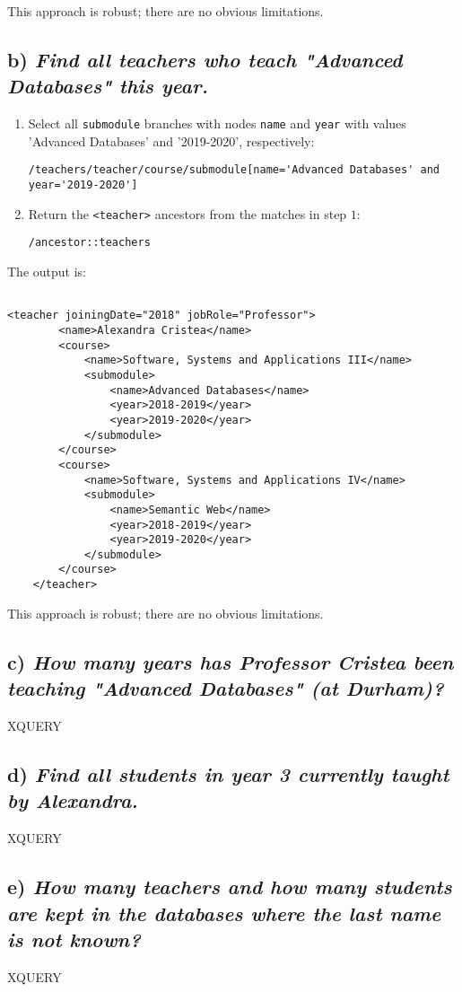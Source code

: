 \documentclass[11pt]{article} %
\begin{document}
This approach is robust; there are no obvious limitations.

\subsection*{b) \textit{Find all teachers who teach "Advanced Databases" this year.}}

\begin{enumerate}

	\item{Select all \verb|submodule| branches with nodes \verb|name| and \verb|year| with values 'Advanced Databases' and '2019-2020', respectively:} 

\begin{center}

	\verb|/teachers/teacher/course/submodule[name='Advanced Databases' and year='2019-2020']|

\end{center}

	\item{Return the \verb|<teacher>| ancestors from the matches in step $1$:}

\begin{center}

	\verb|/ancestor::teachers|

\end{center}

\end{enumerate}

The output is:

\begin{verbatim}

<teacher joiningDate="2018" jobRole="Professor">
        <name>Alexandra Cristea</name>
        <course>
            <name>Software, Systems and Applications III</name>
            <submodule>
                <name>Advanced Databases</name>
                <year>2018-2019</year>
                <year>2019-2020</year>
            </submodule>
        </course>
        <course>
            <name>Software, Systems and Applications IV</name>
            <submodule>
                <name>Semantic Web</name>
                <year>2018-2019</year>
                <year>2019-2020</year>
            </submodule>
        </course>
    </teacher>

\end{verbatim}

This approach is robust; there are no obvious limitations.

\subsection*{c) \textit{How many years has Professor Cristea been teaching "Advanced Databases" (at Durham)?}}

XQUERY

\subsection*{d) \textit{Find all students in year 3 currently taught by Alexandra.}}

XQUERY

\subsection*{e) \textit{How many teachers and how many students are kept in the databases where the last name is not known?}}

XQUERY
\end{document}
